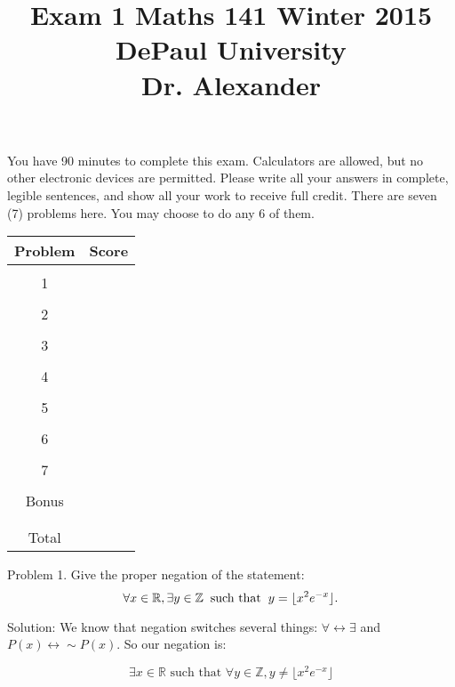 \documentclass[16 pt]{amsart}
\theoremstyle{definition}
\theoremstyle{remark}
\numberwithin{equation}{subsection}
\newcommand{\R}{\mathbb{R}}
\newcommand{\Z}{\mathbb{Z}}
\begin{document}
\title{Exam 1 Maths 141 Winter 2015 \\ DePaul University\\Dr. Alexander}
\maketitle
You have 90 minutes to complete this exam.  Calculators are allowed, but no other electronic devices are permitted.  Please write all your answers in complete, legible sentences, and show all your work to receive full credit.  There are seven (7) problems here.  You may choose to do any 6 of them.  
\vspace{1in}


\begin{center}
  \begin{tabular}{ c | c }
    Problem & Score\\
    \hline
    &\\
    1&\\
    &\\
    2&\\
    &\\
    3&\\
    &\\
    4&\\
    &\\
    5&\\
    &\\
    6&\\
    &\\
    7&\\
    &\\
    Bonus&\\
    &\\
    \hline 
    &\\    
    Total& 
 \end{tabular}
\end{center}

\newpage 
Problem 1. Give the proper negation of the statement:
\[
\forall x\in\R, \exists y\in\Z \hspace{2mm} \text{such that} \hspace{2mm} y=\lfloor x^{2}e^{-x}\rfloor.
\]

\vspace{1in}

Solution: We know that negation switches several things: $\forall \leftrightarrow \exists$ and $P(x)\leftrightarrow \sim P(x)$.  So our negation is:

\[
\exists x\in \R \text{ such that } \forall y\in\Z, y\neq \lfloor x^2 e^{-x} \rfloor
\]
\end{document}
